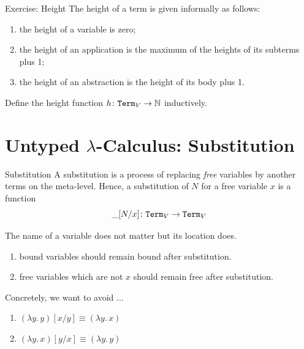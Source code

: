 \begin{frame}{Exercise: Height}
  The height of a term is given informally as follows:
  \begin{enumerate}
    \item the height of a variable is zero;
    \item the height of an application is the maximum of the heights of its subterms plus 1;
    \item the height of an abstraction is the height of its body plus 1.
  \end{enumerate}
  
  Define the height function $h\colon \mathtt{Term}_V \to \mathbb{N}$ inductively.
\end{frame}

\section{Untyped $\lambda$-Calculus: Substitution}

\begin{frame}{Substitution}
   A \alert{substitution} is a process of replacing \emph{free} variables by
   another terms on the meta-level. Hence, a substitution of $N$ for a free
   variable $x$ is a function
   \[
     {\_}[{N}/{x}]\colon \mathtt{Term}_V \to \mathtt{Term}_V
   \]

   The name of a variable does not matter but its location does.
   \begin{enumerate}
     \item bound variables should remain bound after substitution.
     \item free variables which are not $x$ should remain free after substitution.
   \end{enumerate}

   Concretely, we want to avoid ...
  \begin{enumerate}
    \item $(\lambda y.\,y)[x/y] \equiv (\lambda y.\, x)$
    \item $(\lambda y.\, x)[y/x] \equiv (\lambda y.\, y)$ 
  \end{enumerate}
   
  
\end{frame}
  
